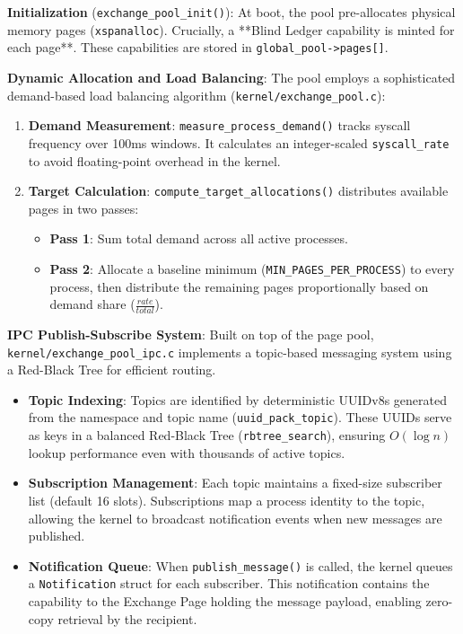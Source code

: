 \documentclass[11pt,letterpaper]{article}
\begin{document}
\textbf{Initialization} (\texttt{exchange_pool_init()}):
At boot, the pool pre-allocates physical memory pages (\texttt{xspanalloc}). Crucially, a **Blind Ledger capability is minted for each page**. These capabilities are stored in \texttt{global_pool->pages[]}.

\textbf{Dynamic Allocation and Load Balancing}:
The pool employs a sophisticated demand-based load balancing algorithm (\texttt{kernel/exchange_pool.c}):
\begin{enumerate}
\item \textbf{Demand Measurement}: \texttt{measure_process_demand()} tracks syscall frequency over 100ms windows. It calculates an integer-scaled \texttt{syscall_rate} to avoid floating-point overhead in the kernel.
\item \textbf{Target Calculation}: \texttt{compute_target_allocations()} distributes available pages in two passes:
    \begin{itemize}
    \item \textbf{Pass 1}: Sum total demand across all active processes.
    \item \textbf{Pass 2}: Allocate a baseline minimum (\texttt{MIN_PAGES_PER_PROCESS}) to every process, then distribute the remaining pages proportionally based on demand share ($\frac{rate}{total}$).
    \end{itemize}
\end{enumerate}

\textbf{IPC Publish-Subscribe System}:
Built on top of the page pool, \texttt{kernel/exchange_pool_ipc.c} implements a topic-based messaging system using a Red-Black Tree for efficient routing.

\begin{itemize}
\item \textbf{Topic Indexing}: Topics are identified by deterministic UUIDv8s generated from the namespace and topic name (\texttt{uuid_pack_topic}). These UUIDs serve as keys in a balanced Red-Black Tree (\texttt{rbtree_search}), ensuring $O(\log n)$ lookup performance even with thousands of active topics.
\item \textbf{Subscription Management}: Each topic maintains a fixed-size subscriber list (default 16 slots). Subscriptions map a process identity to the topic, allowing the kernel to broadcast notification events when new messages are published.
\item \textbf{Notification Queue}: When \texttt{publish_message()} is called, the kernel queues a \texttt{Notification} struct for each subscriber. This notification contains the capability to the Exchange Page holding the message payload, enabling zero-copy retrieval by the recipient.
\end{itemize}
\end{document}
